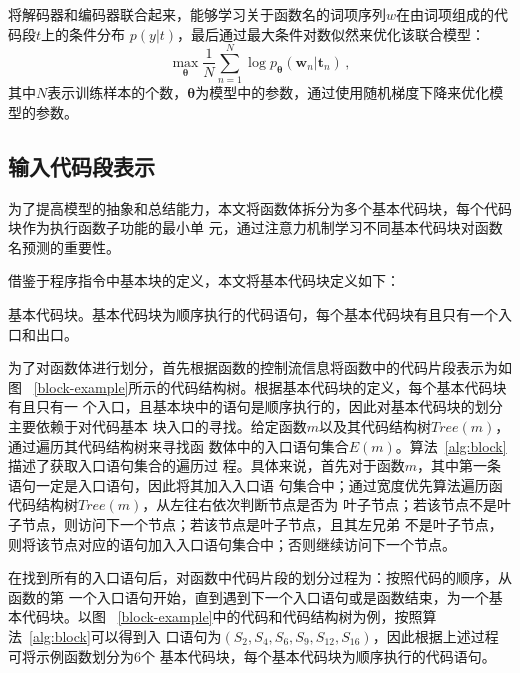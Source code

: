 将解码器和编码器联合起来，能够学习关于函数名的词项序列$w$在由词项组成的代码段$t$上的条件分布
$p(y|t)$，最后通过最大条件对数似然来优化该联合模型：
\begin{equation}
\max \limits_{\bm\theta} \frac{1}{N}\sum_{n=1}^{N} \log p_{\bm\theta}(\bm w_n | 
\bm t_n) \,,
\label{eq:loss}
\end{equation}
其中$N$表示训练样本的个数，$\bm\theta$为模型中的参数，通过使用随机梯度下降来优化模型的参数。

\subsection{输入代码段表示}
\label{represent}
为了提高模型的抽象和总结能力，本文将函数体拆分为多个基本代码块，每个代码块作为执行函数子功能的最小单
元，通过注意力机制学习不同基本代码块对函数名预测的重要性。

借鉴于程序指令中基本块的定义，本文将基本代码块定义如下：
\begin{Definition}
    基本代码块。基本代码块为顺序执行的代码语句，每个基本代码块有且只有一个入口和出口。
\end{Definition}

为了对函数体进行划分，首先根据函数的控制流信息将函数中的代码片段表示为如图
~\ref{block-example}所示的代码结构树。根据基本代码块的定义，每个基本代码块有且只有一
个入口，且基本块中的语句是顺序执行的，因此对基本代码块的划分主要依赖于对代码基本
块入口的寻找。给定函数$m$以及其代码结构树$Tree(m)$，通过遍历其代码结构树来寻找函
数体中的入口语句集合$E(m)$。算法~\ref{alg:block}描述了获取入口语句集合的遍历过
程。具体来说，首先对于函数$m$，其中第一条语句一定是入口语句，因此将其加入入口语
句集合中；通过宽度优先算法遍历函代码结构树$Tree(m)$，从左往右依次判断节点是否为
叶子节点；若该节点不是叶子节点，则访问下一个节点；若该节点是叶子节点，且其左兄弟
不是叶子节点，则将该节点对应的语句加入入口语句集合中；否则继续访问下一个节点。

在找到所有的入口语句后，对函数中代码片段的划分过程为：按照代码的顺序，从函数的第
一个入口语句开始，直到遇到下一个入口语句或是函数结束，为一个基本代码块。以图
~\ref{block-example}中的代码和代码结构树为例，按照算法~\ref{alg:block}可以得到入
口语句为$(S_2,S_4,S_6,S_9,S_{12},S_{16})$，因此根据上述过程可将示例函数划分为6个
基本代码块，每个基本代码块为顺序执行的代码语句。

